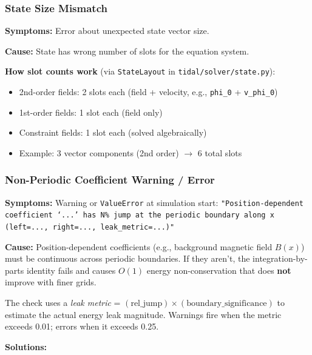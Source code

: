\subsubsection{State Size Mismatch}

\textbf{Symptoms:} Error about unexpected state vector size.

\textbf{Cause:} State has wrong number of slots for the equation system.

\textbf{How slot counts work} (via \texttt{StateLayout} in \texttt{tidal/solver/state.py}):

\begin{itemize}
  \item 2nd-order fields: 2 slots each (field + velocity, e.g., \texttt{phi\_0} + \texttt{v\_phi\_0})
  \item 1st-order fields: 1 slot each (field only)
  \item Constraint fields: 1 slot each (solved algebraically)
  \item Example: 3 vector components (2nd order) $\to$ 6 total slots
\end{itemize}

\subsubsection{Non-Periodic Coefficient Warning / Error}

\textbf{Symptoms:} Warning or \texttt{ValueError} at simulation start:
\texttt{"Position-dependent coefficient `...' has N\% jump at the periodic boundary along x (left=..., right=..., leak\_metric=...)"}

\textbf{Cause:} Position-dependent coefficients (e.g., background magnetic field $B(x)$) must be continuous across periodic boundaries. If they aren't, the integration-by-parts identity fails and causes $O(1)$ energy non-conservation that does \textbf{not} improve with finer grids.

The check uses a \emph{leak metric} = $(\text{rel\_jump}) \times (\text{boundary\_significance})$ to estimate the actual energy leak magnitude. Warnings fire when the metric exceeds 0.01; errors when it exceeds 0.25.

\textbf{Solutions:}

